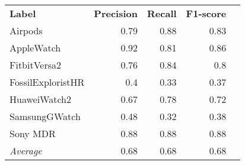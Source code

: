 \begin{tabular}{lrrrr}
    \textbf{Label} & \textbf{Precision} & \textbf{Recall} & \textbf{F1-score} \\
    Airpods & 0.79 & 0.88 & 0.83 \\
    AppleWatch & 0.92 & 0.81 & 0.86 \\
    FitbitVersa2 & 0.76 & 0.84 & 0.8 \\
    FossilExploristHR & 0.4 & 0.33 & 0.37 \\
    HuaweiWatch2 & 0.67 & 0.78 & 0.72 \\
    SamsungGWatch & 0.48 & 0.32 & 0.38 \\
    Sony MDR & 0.88 & 0.88 & 0.88 \\
    \emph{Average} & 0.68 & 0.68 & 0.68 \\
\end{tabular}